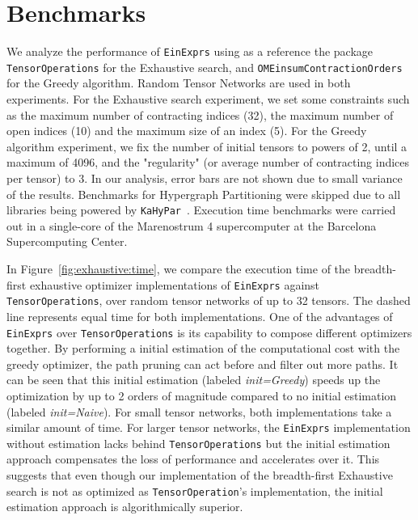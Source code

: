 \documentclass{juliacon}
\begin{document}
\section{Benchmarks}\label{sec:benchmarks}
We analyze the performance of \texttt{EinExprs} using as a reference the package \texttt{TensorOperations} for the Exhaustive search, and \texttt{OMEinsumContractionOrders} for the Greedy algorithm.
Random Tensor Networks are used in both experiments.
For the Exhaustive search experiment, we set some constraints such as the maximum number of contracting indices (32), the maximum number of open indices (10) and the maximum size of an index (5).
For the Greedy algorithm experiment, we fix the number of initial tensors to powers of 2, until a maximum of 4096, and the "regularity" (or average number of contracting indices per tensor) to 3.
In our analysis, error bars are not shown due to small variance of the results.
Benchmarks for Hypergraph Partitioning were skipped due to all libraries being powered by \texttt{KaHyPar}~\cite{10.1145/3529090}.
Execution time benchmarks were carried out in a single-core of the Marenostrum 4 supercomputer at the Barcelona Supercomputing Center.

In Figure~\ref{fig:exhaustive:time}, we compare the execution time of the breadth-first exhaustive optimizer implementations of \texttt{EinExprs} against \texttt{TensorOperations}, over random tensor networks of up to 32 tensors.
The dashed line represents equal time for both implementations. One of the advantages of \texttt{EinExprs} over \texttt{TensorOperations} is its capability to compose different optimizers together. By performing a initial estimation of the computational cost with the greedy optimizer, the path pruning can act before and filter out more paths. It can be seen that this initial estimation (labeled \textit{init=Greedy}) speeds up the optimization by up to 2 orders of magnitude compared to no initial estimation (labeled \textit{init=Naive}).
For small tensor networks, both implementations take a similar amount of time.
For larger tensor networks, the \texttt{EinExprs} implementation without estimation lacks behind \texttt{TensorOperations} but the initial estimation approach compensates the loss of performance and accelerates over it.
This suggests that even though our implementation of the breadth-first Exhaustive search is not as optimized as \texttt{TensorOperation}'s implementation, the initial estimation approach is algorithmically superior.
\end{document}
